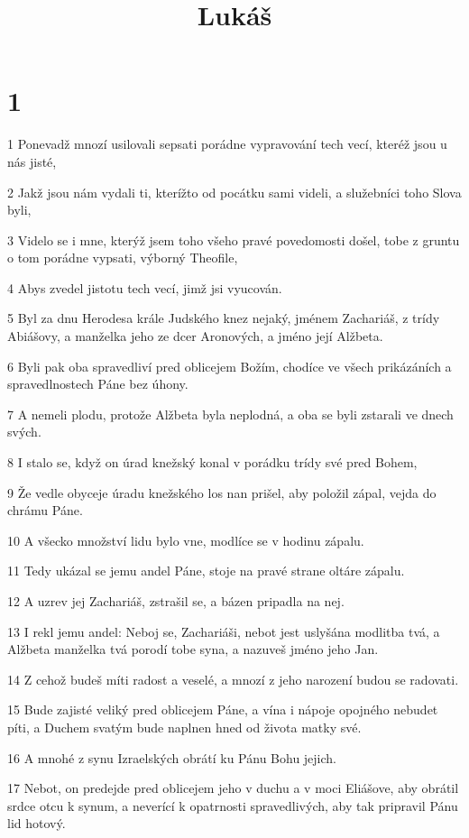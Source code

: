 

\title{Lukáš}

\chapter{1}

\par 1 Ponevadž mnozí usilovali sepsati porádne vypravování tech vecí, kteréž jsou u nás jisté,
\par 2 Jakž jsou nám vydali ti, kterížto od pocátku sami videli, a služebníci toho Slova byli,
\par 3 Videlo se i mne, kterýž jsem toho všeho pravé povedomosti došel, tobe z gruntu o tom porádne vypsati, výborný Theofile,
\par 4 Abys zvedel jistotu tech vecí, jimž jsi vyucován.
\par 5 Byl za dnu Herodesa krále Judského knez nejaký, jménem Zachariáš, z trídy Abiášovy, a manželka jeho ze dcer Aronových, a jméno její Alžbeta.
\par 6 Byli pak oba spravedliví pred oblicejem Božím, chodíce ve všech prikázáních a spravedlnostech Páne bez úhony.
\par 7 A nemeli plodu, protože Alžbeta byla neplodná, a oba se byli zstarali ve dnech svých.
\par 8 I stalo se, když on úrad knežský konal v porádku trídy své pred Bohem,
\par 9 Že vedle obyceje úradu knežského los nan prišel, aby položil zápal, vejda do chrámu Páne.
\par 10 A všecko množství lidu bylo vne, modlíce se v hodinu zápalu.
\par 11 Tedy ukázal se jemu andel Páne, stoje na pravé strane oltáre zápalu.
\par 12 A uzrev jej Zachariáš, zstrašil se, a bázen pripadla na nej.
\par 13 I rekl jemu andel: Neboj se, Zachariáši, nebot jest uslyšána modlitba tvá, a Alžbeta manželka tvá porodí tobe syna, a nazuveš jméno jeho Jan.
\par 14 Z cehož budeš míti radost a veselé, a mnozí z jeho narození budou se radovati.
\par 15 Bude zajisté veliký pred oblicejem Páne, a vína i nápoje opojného nebudet píti, a Duchem svatým bude naplnen hned od života matky své.
\par 16 A mnohé z synu Izraelských obrátí ku Pánu Bohu jejich.
\par 17 Nebot, on predejde pred oblicejem jeho v duchu a v moci Eliášove, aby obrátil srdce otcu k synum, a neverící k opatrnosti spravedlivých, aby tak pripravil Pánu lid hotový.
